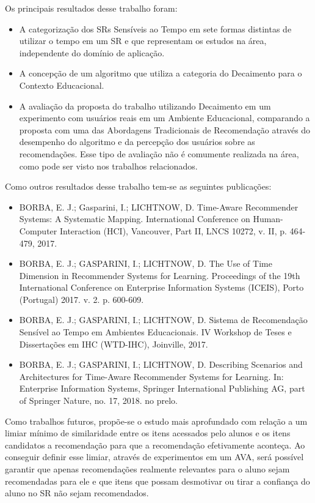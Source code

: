 Os principais resultados desse trabalho foram:

\begin{itemize}
\item A categorização dos SRs Sensíveis ao Tempo em sete formas distintas de utilizar o tempo em um SR e que representam
os estudos na área, independente do domínio de aplicação.
\item A concepção de um algoritmo que utiliza a categoria do Decaimento para o Contexto Educacional.
\item A avaliação da proposta do trabalho utilizando Decaimento em um experimento com usuários reais em um Ambiente Educacional,
comparando a proposta com uma das Abordagens Tradicionais de Recomendação através do desempenho do algoritmo e da percepção
dos usuários sobre as recomendações. Esse tipo de avaliação não é comumente realizada na área, como pode ser visto nos
trabalhos relacionados.
\end{itemize}

Como outros resultados desse trabalho tem-se as seguintes publicações:

\begin{itemize}
\item BORBA, E. J.; Gasparini, I.; LICHTNOW, D. Time-Aware Recommender Systems: A Systematic Mapping. International Conference on Human-Computer Interaction (HCI), Vancouver, Part II, LNCS 10272, v. II, p. 464-479, 2017.
\item BORBA, E. J.; GASPARINI, I.; LICHTNOW, D. The Use of Time Dimension in Recommender Systems for Learning. Proceedings of the 19th International Conference on Enterprise Information Systems (ICEIS), Porto (Portugal) 2017. v. 2. p. 600-609.
\item BORBA, E. J.; GASPARINI, I.; LICHTNOW, D. Sistema de Recomendação Sensível ao Tempo em Ambientes Educacionais. IV Workshop de Teses e Dissertações em IHC (WTD-IHC), Joinville, 2017.
\item BORBA, E. J.; GASPARINI, I.; LICHTNOW, D. Describing Scenarios and Architectures for Time-Aware Recommender Systems for Learning. In: Enterprise Information Systems, Springer International Publishing AG, part of Springer Nature, no. 17, 2018. no prelo.
\end{itemize}

Como trabalhos futuros, propõe-se o estudo mais aprofundado com relação a um limiar mínimo de similaridade entre os itens
acessados pelo alunos e os itens candidatos a recomendação para que a recomendação efetivamente aconteça. Ao conseguir
definir esse limiar, através de experimentos em um AVA, será possível garantir que apenas recomendações realmente relevantes
para o aluno sejam recomendadas para ele e que itens que possam desmotivar ou tirar a confiança do aluno no SR não
sejam recomendados.

